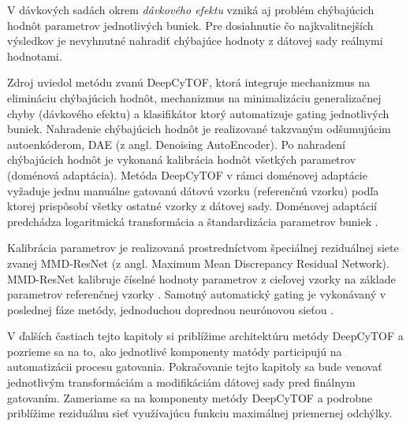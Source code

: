 V dávkových sadách okrem \textit{dávkového efektu} vzniká aj problém chýbajúcich hodnôt parametrov jednotlivých buniek. Pre dosiahnutie čo najkvalitnejších výsledkov je nevyhnutné nahradiť chýbajúce hodnoty z dátovej sady reálnymi hodnotami. 

Zdroj \cite{Li2017} uviedol metódu zvanú DeepCyTOF, ktorá integruje mechanizmus na elimináciu chýbajúcich hodnôt, mechanizmus na minimalizáciu generalizačnej chyby (dávkového efektu) a klasifikátor ktorý automatizuje gating jednotlivých buniek. Nahradenie chýbajúcich hodnôt je realizované takzvaným odšumujúcim autoenkóderom, DAE (z angl. Denoising AutoEncoder). Po nahradení chýbajúcich hodnôt je vykonaná kalibrácia hodnôt všetkých parametrov (doménová adaptácia). Metóda DeepCyTOF v rámci doménovej adaptácie vyžaduje jednu manuálne gatovanú dátovú vzorku (referenčnú vzorku) podľa ktorej prispôsobí všetky ostatné vzorky z dátovej sady. Doménovej adaptácií predchádza logaritmická transformácia a štandardizácia parametrov buniek \cite{Li2017}. 

Kalibrácia parametrov je realizovaná prostredníctvom špeciálnej reziduálnej siete zvanej MMD-ResNet (z angl. Maximum Mean Discrepancy Residual Network). MMD-ResNet kalibruje číselné hodnoty parametrov z cieľovej vzorky na základe parametrov referenčnej vzorky \cite{Li2016}. Samotný automatický gating je vykonávaný v poslednej fáze metódy, jednoduchou doprednou neurónovou sieťou \cite{Li2017}.

V ďalších častiach tejto kapitoly si priblížime architektúru metódy DeepCyTOF a pozrieme sa na to, ako jednotlivé komponenty matódy participujú na automatizácii procesu gatovania. Pokračovanie tejto kapitoly sa bude venovať jednotlivým transformáciám a modifikáciám dátovej sady pred finálnym gatovaním. Zameriame sa na komponenty metódy DeepCyTOF a podrobne priblížime reziduálnu sieť využívajúcu funkciu maximálnej priemernej odchýlky.

